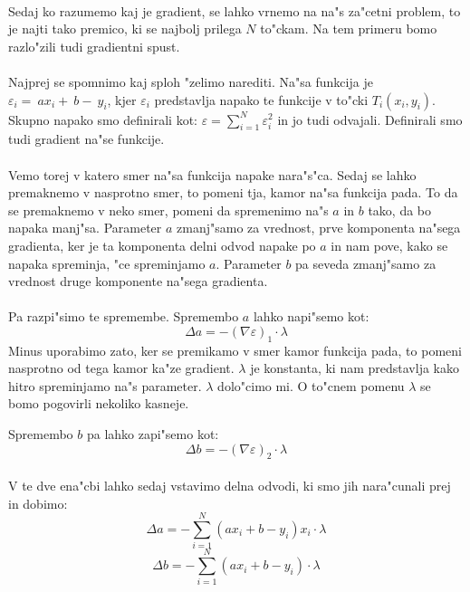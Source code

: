 \paragraph{}
Sedaj ko razumemo kaj je gradient, se lahko vrnemo na na"s za"cetni problem, to je najti tako premico, ki se najbolj prilega $N$ to"ckam. Na tem primeru bomo razlo"zili tudi gradientni spust.

\paragraph{}
Najprej se spomnimo kaj sploh "zelimo narediti. Na"sa funkcija je $\varepsilon_i = ~ax_i + ~b - ~y_i$, kjer $\varepsilon_i$ predstavlja napako te funkcije v to"cki $T_i(x_i, y_i)$. Skupno napako smo definirali kot: $\varepsilon = \sum_{i=1}^{N} \varepsilon_i^2$ in jo tudi odvajali. Definirali smo tudi gradient na"se funkcije.

\paragraph{}
Vemo torej v katero smer na"sa funkcija napake nara"s"ca. Sedaj se lahko premaknemo v nasprotno smer, to pomeni tja, kamor na"sa funkcija pada. To da se premaknemo v neko smer, pomeni da spremenimo na"s $a$ in $b$ tako, da bo napaka manj"sa. Parameter $a$ zmanj"samo za vrednost, prve komponenta na"sega gradienta, ker je ta komponenta delni odvod napake po $a$ in nam pove, kako se napaka spreminja, "ce spreminjamo $a$. Parameter $b$ pa seveda zmanj"samo za vrednost druge komponente na"sega gradienta.

\paragraph{}
Pa razpi"simo te spremembe. Spremembo $a$ lahko napi"semo kot:
\[\Delta a = -(\nabla \varepsilon)_1 \cdot \lambda\]
Minus uporabimo zato, ker se premikamo v smer kamor funkcija pada, to pomeni nasprotno od tega kamor ka"ze gradient. $\lambda$ je konstanta, ki nam predstavlja kako hitro spreminjamo na"s parameter. $\lambda$ dolo"cimo mi. O to"cnem pomenu $\lambda$ se bomo pogovirli nekoliko kasneje.

Spremembo $b$ pa lahko zapi"semo kot:
\[\Delta b = -(\nabla \varepsilon)_2 \cdot \lambda\]

\paragraph{}
V te dve ena"cbi lahko sedaj vstavimo delna odvodi, ki smo jih nara"cunali prej in dobimo:
\[\Delta a = -\sum_{i=1}^{N} (a x_i + b - y_i)x_i \cdot \lambda \]
\[\Delta b = -\sum_{i=1}^{N} (a x_i + b - y_i) \cdot \lambda \]

